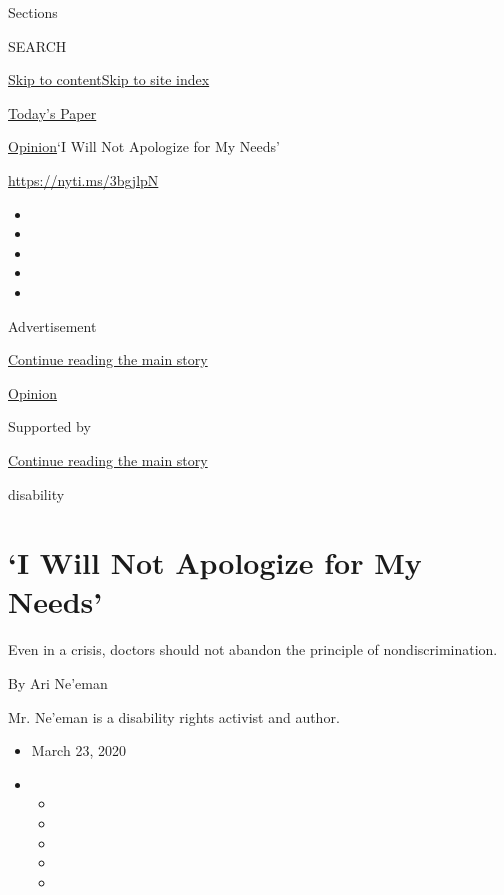 Sections

SEARCH

\protect\hyperlink{site-content}{Skip to
content}\protect\hyperlink{site-index}{Skip to site index}

\href{https://myaccount.nytimes3xbfgragh.onion/auth/login?response_type=cookie\&client_id=vi}{}

\href{https://www.nytimes3xbfgragh.onion/section/todayspaper}{Today's
Paper}

\href{/section/opinion}{Opinion}\textbar{}`I Will Not Apologize for My
Needs'

\url{https://nyti.ms/3bgjlpN}

\begin{itemize}
\item
\item
\item
\item
\item
\end{itemize}

Advertisement

\protect\hyperlink{after-top}{Continue reading the main story}

\href{/section/opinion}{Opinion}

Supported by

\protect\hyperlink{after-sponsor}{Continue reading the main story}

disability

\hypertarget{i-will-not-apologize-for-my-needs}{%
\section{`I Will Not Apologize for My
Needs'}\label{i-will-not-apologize-for-my-needs}}

Even in a crisis, doctors should not abandon the principle of
nondiscrimination.

By Ari Ne'eman

Mr. Ne'eman is a disability rights activist and author.

\begin{itemize}
\item
  March 23, 2020
\item
  \begin{itemize}
  \item
  \item
  \item
  \item
  \item
  \end{itemize}
\end{itemize}


